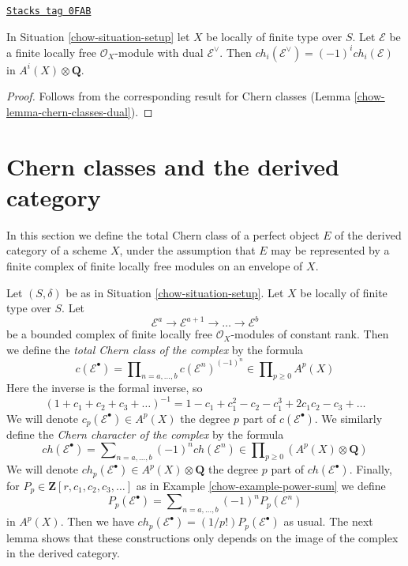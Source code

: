 \begin{lemma}
\label{chow-lemma-chern-character-dual}
\href{https://stacks.math.columbia.edu/tag/0FAB}{\texttt{Stacks tag 0FAB}}

In Situation \ref{chow-situation-setup} let $X$ be locally of finite type over $S$.
Let $\mathcal{E}$ be a finite locally free $\mathcal{O}_X$-module
with dual $\mathcal{E}^\vee$. Then
$ch_i(\mathcal{E}^\vee) = (-1)^i ch_i(\mathcal{E})$ in
$A^i(X) \otimes \mathbf{Q}$.
\end{lemma}

\begin{proof}

Follows from the corresponding result for Chern classes
(Lemma \ref{chow-lemma-chern-classes-dual}).
\end{proof}

\section{Chern classes and the derived category}
\label{chow-section-pre-derived}
In this section we define the total Chern class of a perfect object $E$
of the derived category of a scheme $X$, under the assumption that $E$
may be represented by a finite complex of finite locally free modules
on an envelope of $X$.

\medskip\noindent
Let $(S, \delta)$ be as in Situation \ref{chow-situation-setup}.
Let $X$ be locally of finite type over $S$. Let
$$
\mathcal{E}^a \to \mathcal{E}^{a + 1} \to \ldots \to \mathcal{E}^b
$$
be a bounded complex of finite locally free $\mathcal{O}_X$-modules
of constant rank.
Then we define the {\it total Chern class of the complex} by the formula
$$
c(\mathcal{E}^\bullet) = \prod\nolimits_{n = a, \ldots, b}
c(\mathcal{E}^n)^{(-1)^n} \in \prod\nolimits_{p \geq 0} A^p(X)
$$
Here the inverse is the formal inverse, so
$$
(1 + c_1 + c_2 + c_3 + \ldots)^{-1} =
1 - c_1 + c_1^2 - c_2 - c_1^3 + 2c_1 c_2 - c_3 + \ldots
$$
We will denote $c_p(\mathcal{E}^\bullet) \in A^p(X)$
the degree $p$ part of $c(\mathcal{E}^\bullet)$.
We similarly define the {\it Chern character of the complex} by
the formula
$$
ch(\mathcal{E}^\bullet) = \sum\nolimits_{n = a, \ldots, b}
(-1)^n ch(\mathcal{E}^n) \in
\prod\nolimits_{p \geq 0} (A^p(X) \otimes \mathbf{Q})
$$
We will denote $ch_p(\mathcal{E}^\bullet) \in A^p(X) \otimes \mathbf{Q}$
the degree $p$ part of $ch(\mathcal{E}^\bullet)$.
Finally, for $P_p \in \mathbf{Z}[r, c_1, c_2, c_3, \ldots]$
as in Example \ref{chow-example-power-sum} we define
$$
P_p(\mathcal{E}^\bullet) = \sum\nolimits_{n = a, \ldots, b}
(-1)^n P_p(\mathcal{E}^n)
$$
in $A^p(X)$. Then we have
$ch_p(\mathcal{E}^\bullet) = (1/p!)P_p(\mathcal{E}^\bullet)$
as usual. The next lemma shows that these constructions only depends
on the image of the complex in the derived category.

